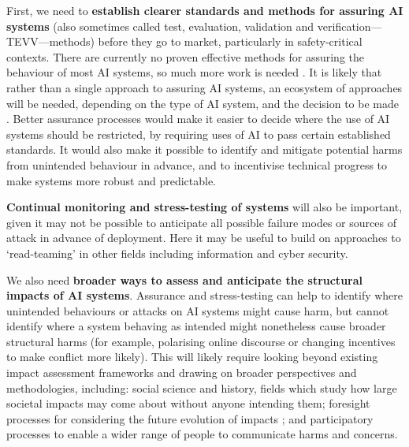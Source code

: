 \documentclass{article}
\begin{document}
First, we need to \textbf{establish clearer standards and methods for assuring AI systems} (also sometimes called test, evaluation, validation and verification---TEVV---methods) before they go to market, particularly in safety-critical contexts. There are currently no proven effective methods for assuring the behaviour of most AI systems, so much more work is needed \citep{flournoy_building_2020}. It is likely that rather than a single approach to assuring AI systems, an ecosystem of approaches will be needed, depending on the type of AI system, and the decision to be made \citep{ahamat_types_2021}. Better assurance processes would make it easier to decide where the use of AI systems should be restricted, by requiring uses of AI to pass certain established standards. It would also make it possible to identify and mitigate potential harms from unintended behaviour in advance, and to incentivise technical progress to make systems more robust and predictable.


\textbf{Continual monitoring and stress-testing of systems }will also be important, given it may not be possible to anticipate all possible failure modes or sources of attack in advance of deployment. Here it may be useful to build on approaches to ‘read-teaming’ in other fields including information and cyber security\citep{brundage_malicious_2018}.


We also need \textbf{broader ways to assess and anticipate the structural impacts of AI systems}. Assurance and stress-testing can help to identify where unintended behaviours or attacks on AI systems might cause harm, but cannot identify where a system behaving as intended might nonetheless cause broader structural harms (for example, polarising online discourse or changing incentives to make conflict more likely)\citep{zwetsloot_thinking_2019}. This will likely require looking beyond existing impact assessment frameworks and drawing on broader perspectives and methodologies, including: social science and history, fields which study how large societal impacts may come about without anyone intending them\citep{zwetsloot_thinking_2019}; foresight processes for considering the future evolution of impacts \citep{noauthor_government_2017}; and participatory processes to enable a wider range of people to communicate harms and concerns\citep{smith_our_2019}.
\end{document}
